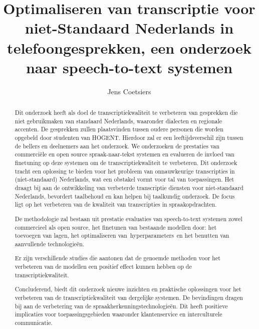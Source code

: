 \documentclass{hogent-article}
\title{Optimaliseren van transcriptie voor niet-Standaard Nederlands in telefoongesprekken, een onderzoek naar speech-to-text systemen}
\author{Jens Coetsiers}
\begin{document}
\begin{abstract}
Dit onderzoek heeft als doel de transcriptiekwaliteit te verbeteren van gesprekken die niet gebruikmaken van standaard Nederlands, waaronder dialecten en regionale accenten. De gesprekken zullen plaatsvinden tussen oudere personen die worden opgebeld door studenten van HOGENT. Hierdoor zal er een leeftijdsverschil zijn tussen de bellers en deelnemers aan het onderzoek.
We onderzoeken de prestaties van commerciële en open source spraak-naar-tekst systemen en evalueren de invloed van finetuning op deze systemen om de transcriptiekwaliteit te verbeteren. Dit onderzoek tracht een oplossing te bieden voor het probleem van onnauwkeurige transcripties in (niet-standaard) Nederlands, wat een obstakel vormt voor tal van toepassingen. Het draagt bij aan de ontwikkeling van verbeterde transcriptie diensten voor niet-standaard Nederlands, bevordert taalbehoud en kan helpen bij taalkundig onderzoek. De focus ligt op het verbeteren van de kwaliteit van transcripties in spraakopdrachten.

De methodologie zal bestaan uit prestatie evaluaties van speech-to-text systemen zowel commercieel als open source, het finetunen van bestaande modellen door: het toevoegen van lagen, het optimaliseren van hyperparameters en het benutten van aanvullende technologieën.

Er zijn verschillende studies die aantonen dat de genoemde methoden voor het verbeteren van de modellen een positief effect kunnen hebben op de transcriptiekwaliteit.

Concluderend, biedt dit onderzoek nieuwe inzichten en praktische oplossingen voor het verbeteren van de transcriptiekwaliteit van dergelijke systemen. De bevindingen dragen bij aan de verbetering van de spraakherkenningstechnologieën. Dit heeft positieve implicaties voor toepassingsgebieden waaronder klantenservice en interculturele communicatie.
\end{abstract}

\tableofcontents



\printbibliography[heading=bibintoc]
\end{document}
